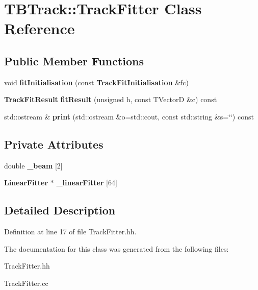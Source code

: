 \section{TBTrack::TrackFitter Class Reference}
\label{classTBTrack_1_1TrackFitter}
\subsection*{Public Member Functions}
\begin{DoxyCompactItemize}
\item 
void {\bfseries fitInitialisation} (const {\bf TrackFitInitialisation} \&fc)\label{classTBTrack_1_1TrackFitter_a2460810173c203d8a9dab70f3481a48b}

\item 
{\bf TrackFitResult} {\bfseries fitResult} (unsigned h, const TVectorD \&c) const \label{classTBTrack_1_1TrackFitter_a1ecf97b17f92a8e151d751952a8a4077}

\item 
std::ostream \& {\bfseries print} (std::ostream \&o=std::cout, const std::string \&s=\char`\"{}\char`\"{}) const \label{classTBTrack_1_1TrackFitter_a8e2e95aaccd987917e16a9475e3ec37d}

\end{DoxyCompactItemize}
\subsection*{Private Attributes}
\begin{DoxyCompactItemize}
\item 
double {\bfseries \_\-beam} [2]\label{classTBTrack_1_1TrackFitter_a7863eee7e5607686b64eed9de3acc7ce}

\item 
{\bf LinearFitter} $\ast$ {\bfseries \_\-linearFitter} [64]\label{classTBTrack_1_1TrackFitter_a315a4d5931c5e1d1aea888f7d2b0679b}

\end{DoxyCompactItemize}


\subsection{Detailed Description}


Definition at line 17 of file TrackFitter.hh.

The documentation for this class was generated from the following files:\begin{DoxyCompactItemize}
\item 
TrackFitter.hh\item 
TrackFitter.cc\end{DoxyCompactItemize}
